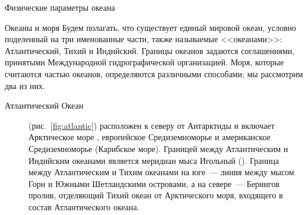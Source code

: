 \begin{chapter}{Физические параметры океана}
\begin{section}{Океаны и моря}
Будем полагать, что существует единый мировой океан, условно поделенный
на три именованные части, также называемые <<океанами>>: Атлантический, 
Тихий и Индийский. Границы океанов задаются соглашениями, принятыми 
Международной гидрографической организацией. Моря, которые считаются 
частью океанов, определяются различными способами; мы рассмотрим два из них. 
%


\begin{description}
\item[Атлантический Океан] (рис.~\ref{fig:atlantic}) расположен к северу от
Антарктиды и включает Арктическое море%
, европейское
Средиземноморье и американское Средиземноморье (Карибское
море). Границей между Атлантическим и Индийским океанами является
меридиан мыса Игольный (). Граница между Атлантическим и Тихим
океанами на юге~--- линия между мысом Горн и Южными Шетландскими
островами, а на севере~--- Берингов пролив, отделяющий Тихий океан от
Арктического моря, входящего в состав Атлантического океана.
%


\end{description}
\end{section}
\end{chapter}

